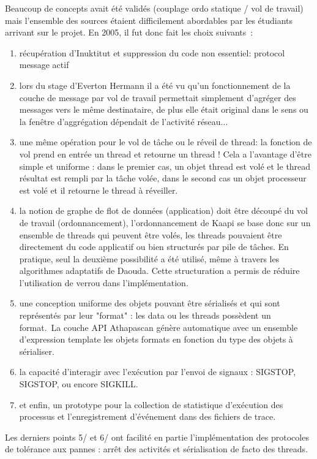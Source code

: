 \documentclass[12pt]{report}
\begin{document}
Beaucoup de concepts avait été validés (couplage ordo statique / vol de travail) mais l'ensemble des sources étaient difficilement abordables par les étudiants arrivant sur le projet. En 2005, il fut donc fait les choix suivants~:
\begin{enumerate}
\item récupération d'Inuktitut et suppression du code non essentiel: protocol message actif
\item lors du stage d'Everton Hermann il a été vu qu'un fonctionnement de la couche de message par vol de travail permettait simplement d'agréger des messages vers le même destinataire, de plus elle était original dans le sens ou la fenêtre d'aggrégation dépendait de l'activité réseau...
\item une même opération pour le vol de tâche ou le réveil de thread: la fonction de vol prend en entrée un thread et retourne un thread ! Cela a l'avantage d'être simple et uniforme : dans le premier cas, un objet thread est volé et le thread résultat est rempli par la tâche volée, dans le second cas un objet processeur est volé et il retourne le thread à réveiller. 
\item la notion de graphe de flot de données (application) doit être découpé du vol de travail (ordonnancement), l'ordonnancement de Kaapi se base donc sur un ensemble de threads qui peuvent être volés, les threads pouvaient être directement du code applicatif ou bien structurés par pile de tâches. En pratique, seul la deuxième possibilité a été utilisé, même à travers les algorithmes adaptatifs de Daouda. Cette structuration a permis de réduire l'utilisation de verrou dans l'implémentation.
\item une conception uniforme des objets pouvant être sérialisés et qui sont représentés par leur "format" : les data ou les threads possèdent un format. La couche API Athapascan génère automatique avec un ensemble d'expression template les objets formats en fonction du type des objets à sérialiser.
\item la capacité d'interagir avec l'exécution par l'envoi de signaux : SIGSTOP, SIGSTOP, ou encore SIGKILL.
\item et enfin, un prototype pour la collection de statistique d'exécution des processus et l'enregistrement d'événement dans des fichiers de trace. 
\end{enumerate}

Les derniers points 5/ et 6/ ont facilité en partie l'implémentation des protocoles de tolérance aux pannes : arrêt des activités et sérialisation de facto des threads.
\end{document}
